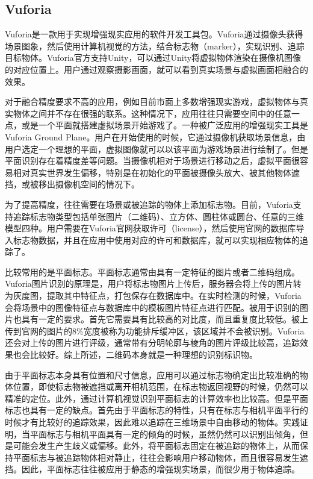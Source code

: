 \subsection{Vuforia}
Vuforia\cite{Vuforia}是一款用于实现增强现实应用的软件开发工具包。Vuforia通过摄像头获得场景图象，然后使用计算机视觉的方法，结合标志物（marker），实现识别、追踪目标物体。Vuforia官方支持Unity，可以通过Unity将虚拟物体渲染在摄像机图像的对应位置上。用户通过观察摄影画面，就可以看到真实场景与虚拟画面相融合的效果。
	
对于融合精度要求不高的应用，例如目前市面上多数增强现实游戏，虚拟物体与真实物体之间并不存在很强的联系。这种情况下，应用往往只需要空间中的任意一点，或是一个平面就搭建虚拟场景开始游戏了。一种被广泛应用的增强现实工具是Vuforia Ground Plane\cite{VuforiaGround}。用户在开始使用的时候，它通过摄像机获取场景信息，由用户选定一个理想的平面，虚拟图像就可以以该平面为游戏场景进行绘制了。但是平面识别存在着精度差等问题。当摄像机相对于场景进行移动之后，虚拟平面很容易相对真实世界发生偏移，特别是在初始化的平面被摄像头放大、被其他物体遮挡，或被移出摄像机空间的情况下。

为了提高精度，往往需要在场景或被追踪的物体上添加标志物。目前，Vuforia支持追踪标志物类型包括单张图片（二维码）、立方体、圆柱体或圆台、任意的三维模型四种。用户需要在Vuforia官网获取许可（license），然后使用官网的数据库导入标志物数据，并且在应用中使用对应的许可和数据库，就可以实现相应物体的追踪了。
	
比较常用的是平面标志。平面标志通常由具有一定特征的图片或者二维码组成。Vuforia图片识别的原理是，用户将标志物图片上传后，服务器会将上传的图片转为灰度图，提取其中特征点，打包保存在数据库中。在实时检测的时候，Vuforia会将场景中的图像特征点与数据库中的模板图片特征点进行匹配。被用于识别的图片也具有一定的要求。首先它需要具有比较高的对比度，而且重复度比较低。被上传到官网的图片的8\%宽度被称为功能排斥缓冲区，该区域并不会被识别。Vuforia还会对上传的图片进行评级，通常带有分明轮廓与棱角的图片评级比较高，追踪效果也会比较好。综上所述，二维码本身就是一种理想的识别标识物。

由于平面标志本身具有位置和尺寸信息，应用可以通过标志物确定出比较准确的物体位置，即使标志物被遮挡或离开相机范围，在标志物返回视野的时候，仍然可以精准的定位。此外，通过计算机视觉识别平面标志的计算效率也比较高。但是平面标志也具有一定的缺点。首先由于平面标志的特性，只有在标志与相机平面平行的时候才有比较好的追踪效果，因此难以追踪在三维场景中自由移动的物体。实践证明，当平面标志与相机平面具有一定的倾角的时候，虽然仍然可以识别出倾角，但是可能会发生产生歧义或偏移。此外，将平面标志固定在被追踪的物体上，从而保持平面标志与被追踪物体相对静止，往往会影响用户移动物体，而且很容易发生遮挡。因此，平面标志往往被应用于静态的增强现实场景，而很少用于物体追踪。

